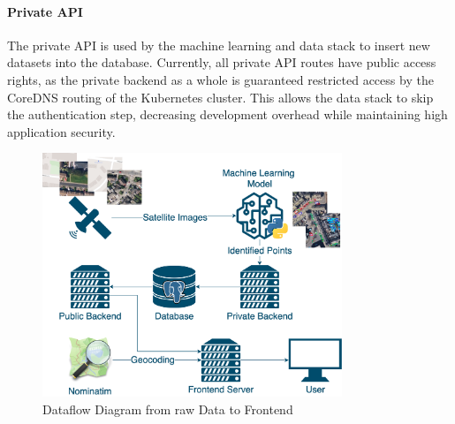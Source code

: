 
\paragraph{Private API}
The private API is used by the machine learning and data stack to insert new
datasets into the database. Currently, all private API routes have public access
rights, as the private backend as a whole is guaranteed restricted access by the
CoreDNS routing of the Kubernetes cluster. This allows the data stack to skip
the authentication step, decreasing development overhead while maintaining high
application security.

\begin{figure}[htbp]
  \centering{}
  \includegraphics[width=0.8\textwidth]{images/dataflow_5.png}
  \caption{Dataflow Diagram from raw Data to Frontend}
  \label{fig:dataflow}
\end{figure}

